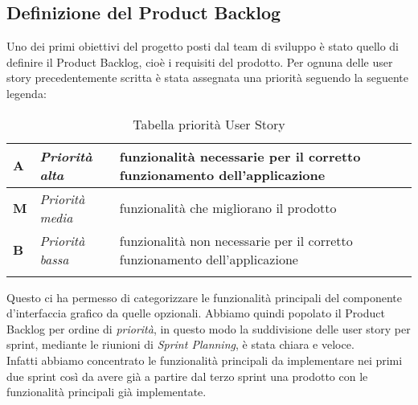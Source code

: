 \subsection{Definizione del Product Backlog}
Uno dei primi obiettivi del progetto posti dal team di sviluppo è stato quello di definire il Product Backlog, cioè i requisiti del prodotto. Per ognuna delle user story precedentemente scritta è stata assegnata una priorità seguendo la seguente legenda:
\begin{longtable} {
		|>{\centering}p{10mm}| 
		|>{}p{25mm}|
		|>{}p{85mm}|
		>{}p{0mm}}
	\hline
	\textbf{A} & \textit{Priorità alta}  & funzionalità necessarie per il corretto funzionamento dell'applicazione \\ \hline
	\textbf{M} & \textit{Priorità media} & funzionalità che migliorano il prodotto \\ \hline
	\textbf{B} & \textit{Priorità bassa} & funzionalità non necessarie per il corretto funzionamento dell'applicazione \\ \hline
	\hline
	\caption{Tabella priorità User Story}
\end{longtable}
\noindent
Questo ci ha permesso di categorizzare le funzionalità principali del componente d'interfaccia grafico da quelle opzionali. Abbiamo quindi popolato il Product Backlog per ordine di \textit{priorità}, in questo modo la suddivisione delle user story per sprint, mediante le riunioni di \textit{Sprint Planning}, è stata chiara e veloce. \\
Infatti abbiamo concentrato le funzionalità principali da implementare nei primi due sprint così da avere già a partire dal terzo sprint una prodotto con le funzionalità principali già implementate.


